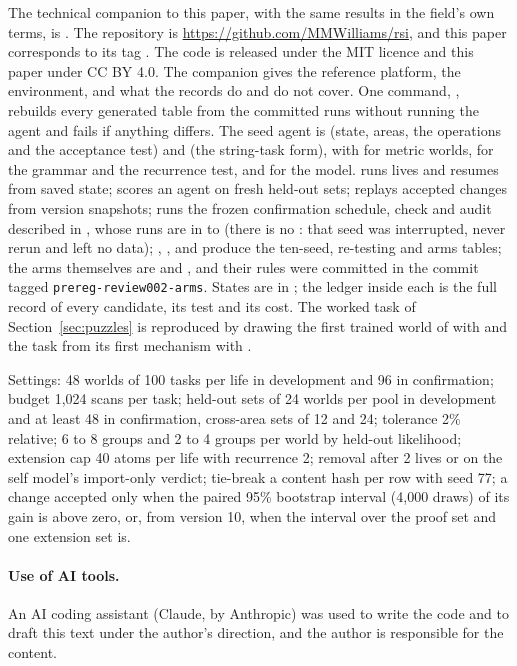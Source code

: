\documentclass[11pt]{article}
\begin{document}
The technical companion to this paper, with the same results in the field's own terms, is . The repository is \url{https://github.com/MMWilliams/rsi}, and this paper corresponds to its tag . The code is released under the MIT licence and this paper under CC BY 4.0. The companion gives the reference platform, the environment, and what the records do and do not cover. One command, , rebuilds every generated table from the committed runs without running the agent and fails if anything differs. The seed agent is  (state, areas, the operations and the acceptance test) and  (the string-task form), with  for metric worlds,  for the grammar and the recurrence test, and  for the model.  runs lives and resumes from saved state;  scores an agent on fresh held-out sets;  replays accepted changes from version snapshots;  runs the frozen confirmation schedule, check and audit described in , whose runs are in  to  (there is no : that seed was interrupted, never rerun and left no data); , ,  and  produce the ten-seed, re-testing and arms tables; the arms themselves are  and , and their rules were committed in the commit tagged \texttt{prereg-review002-arms}. States are in ; the ledger inside each is the full record of every candidate, its test and its cost. The worked task of Section~\ref{sec:puzzles} is reproduced by drawing the first trained world of  with  and the task from its first mechanism with .

Settings: 48 worlds of 100 tasks per life in development and 96 in confirmation; budget 1,024 scans per task; held-out sets of 24 worlds per pool in development and at least 48 in confirmation, cross-area sets of 12 and 24; tolerance 2\% relative; 6 to 8 groups and 2 to 4 groups per world by held-out likelihood; extension cap 40 atoms per life with recurrence 2; removal after 2 lives or on the self model's import-only verdict; tie-break a content hash per row with seed 77; a change accepted only when the paired 95\% bootstrap interval (4,000 draws) of its gain is above zero, or, from version 10, when the interval over the proof set and one extension set is.

\paragraph{Use of AI tools.} An AI coding assistant (Claude, by Anthropic) was used to write the code and to draft this text under the author's direction, and the author is responsible for the content.
\end{document}
